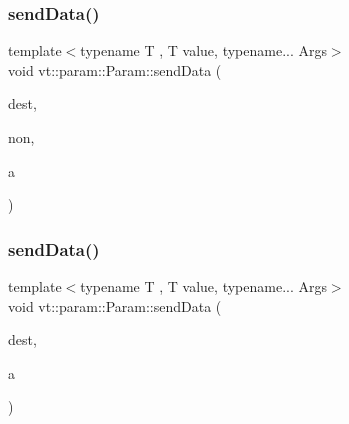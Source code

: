 \mbox{\label{structvt_1_1param_1_1_param_ac71ae9da515916042649b9c6074cbdf3}} 
\subsubsection{\texorpdfstring{send\+Data()}{sendData()}\hspace{0.1cm}{\footnotesize\ttfamily [3/7]}}
{\footnotesize\ttfamily template$<$typename T , T value, typename... Args$>$ \\
void vt\+::param\+::\+Param\+::send\+Data (\begin{DoxyParamCaption}\item[{\hyperlink{namespacevt_a866da9d0efc19c0a1ce79e9e492f47e2}{Node\+Type} const \&}]{dest,  }\item[{\hyperlink{structvt_1_1param_1_1_non_type}{Non\+Type}$<$ T, value $>$ \+\_\+\+\_\+attribute\+\_\+\+\_\+((unused))}]{non,  }\item[{Args \&\&...}]{a }\end{DoxyParamCaption})\hspace{0.3cm}{\ttfamily [inline]}}

\mbox{\label{structvt_1_1param_1_1_param_ae748b6bd022c33e842a83a50865454be}} 
\subsubsection{\texorpdfstring{send\+Data()}{sendData()}\hspace{0.1cm}{\footnotesize\ttfamily [4/7]}}
{\footnotesize\ttfamily template$<$typename T , T value, typename... Args$>$ \\
void vt\+::param\+::\+Param\+::send\+Data (\begin{DoxyParamCaption}\item[{\hyperlink{namespacevt_a866da9d0efc19c0a1ce79e9e492f47e2}{Node\+Type} const \&}]{dest,  }\item[{Args \&\&...}]{a }\end{DoxyParamCaption})\hspace{0.3cm}{\ttfamily [inline]}}

